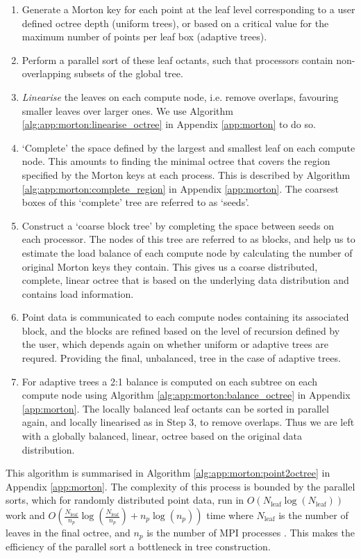 \begin{enumerate}
    \item Generate a Morton key for each point at the leaf level corresponding to a user defined octree depth (uniform trees), or based on a critical value for the maximum number of points per leaf box (adaptive trees).
    \item Perform a parallel sort of these leaf octants, such that processors contain non-overlapping subsets of the global tree.
    \item \textit{Linearise} the leaves on each compute node, i.e. remove overlaps, favouring smaller leaves over larger ones. We use Algorithm \ref{alg:app:morton:linearise_octree} in Appendix \ref{app:morton} to do so.
    \item `Complete' the space defined by the largest and smallest leaf on each compute node. This amounts to finding the minimal octree that covers the region specified by the Morton keys at each process. This is described by Algorithm \ref{alg:app:morton:complete_region} in Appendix \ref{app:morton}. The coarsest boxes of this `complete' tree are referred to as `seeds'.
    \item Construct a `coarse block tree' by completing the space between seeds on each processor. The nodes of this tree are referred to as blocks, and help us to estimate the load balance of each compute node by calculating the number of original Morton keys they contain. This gives us a coarse distributed, complete, linear octree that is based on the underlying data distribution and contains load information.
    \item Point data is communicated to each compute nodes containing its associated block, and the blocks are refined based on the level of recursion defined by the user, which depends again on whether uniform or adaptive trees are requred. Providing the final, unbalanced, tree in the case of adaptive trees.
    \item For adaptive trees a 2:1 balance is computed on each subtree on each compute node using Algorithm \ref{alg:app:morton:balance_octree} in Appendix \ref{app:morton}. The locally balanced leaf octants can be sorted in parallel again, and locally linearised as in Step 3, to remove overlaps. Thus we are left with a globally balanced, linear, octree based on the original data distribution.
\end{enumerate}

This algorithm is summarised in Algorithm \ref{alg:app:morton:point2octree} in Appendix \ref{app:morton}. The complexity of this process is bounded by the parallel sorts, which for randomly distributed point data, run in $O(N_{\text{leaf}} \log (N_{\text{leaf}}))$ work and $O(\frac{N_{\text{leaf}}}{n_p} \log(\frac{N_{\text{leaf}}}{n_p}) + n_p \log (n_p))$ time where $N_{\text{leaf}}$ is the number of leaves in the final octree, and $n_p$ is the number of MPI processes \cite{sundar2013hyksort}. This makes the efficiency of the parallel sort a bottleneck in tree construction.

